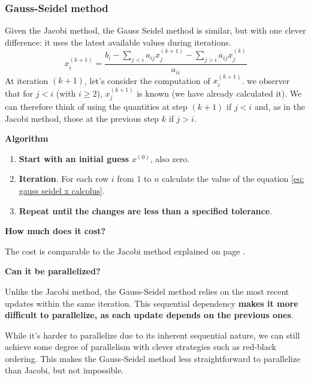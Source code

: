 \subsubsection{Gauss-Seidel method}

Given the Jacobi method, the Gauss Seidel method is similar, but with one clever difference: it uses the latest available values during iterations.
\begin{equation}\label{eq: gauss seidel x calcolus}
    x_{i}^{\left(k+1\right)} = \dfrac{b_{i} - \displaystyle\sum_{j < i} a_{ij}x_{j}^{\left(k+1\right)} - \displaystyle\sum_{j > i}a_{ij}x_{j}^{\left(k\right)}}{a_{ii}}
\end{equation}
At iteration $\left(k+1\right)$, let's consider the computation of $x_{i}^{\left(k+1\right)}$. we observer that for $j < i$ (with $i \ge 2$), $x_{j}^{\left(k+1\right)}$ is known (we have already calculated it). We can therefore think of using the quantities at step $\left(k+1\right)$ if $j<i$ and, as in the Jacobi method, those at the previous step $k$ if $j > i$.

\highspace
\begin{flushleft}
    \textcolor{Green3}{ \textbf{Algorithm}}
\end{flushleft}
\begin{enumerate}
    \item \textbf{Start with an initial guess} $x^{\left(0\right)}$, also zero.
    \item \textbf{Iteration}. For each row $i$ from $1$ to $n$ calculate the value of the equation \ref{eq: gauss seidel x calcolus}.
    \item \textbf{Repeat until the changes are less than a specified tolerance}.
\end{enumerate}

\highspace
\begin{flushleft}
    \textcolor{Red2}{ \textbf{How much does it cost?}}
\end{flushleft}
The cost is comparable to the Jacobi method explained on page \pageref{general-ref: cost jacobi method}.

\highspace
\begin{flushleft}
    \textcolor{Green3}{ \textbf{Can it be parallelized?}}
\end{flushleft}
Unlike the Jacobi method, the Gauss-Seidel method relies on the most recent updates within the same iteration. This sequential dependency \textbf{makes it more difficult to parallelize, as each update depends on the previous ones}.

\highspace
While it's harder to parallelize due to its inherent sequential nature, we can still achieve some degree of parallelism with clever strategies such as red-black ordering. This makes the Gauss-Seidel method less straightforward to parallelize than Jacobi, but not impossible.
